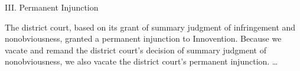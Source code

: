 III. Permanent Injunction

The district court, based on its grant of summary judgment of infringement and
nonobviousness, granted a permanent injunction to Innovention. Because we
vacate and remand the district court's decision of summary judgment of
nonobviousness, we also vacate the district court's permanent injunction.
{\dots}

